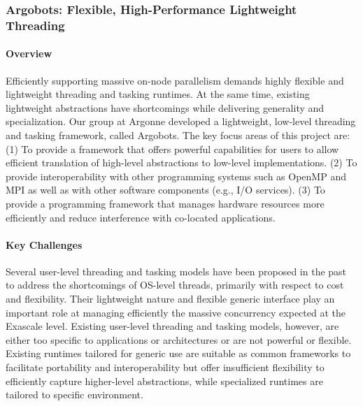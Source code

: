 \subsubsection{ Argobots: Flexible, High-Performance Lightweight Threading }

\paragraph{Overview}

Efficiently supporting massive on-node parallelism demands highly
flexible and lightweight threading and tasking runtimes. At the
same time, existing lightweight abstractions have shortcomings while
delivering generality and specialization.  Our group at Argonne
developed a lightweight, low-level threading and tasking framework,
called Argobots.  The key focus areas of this project are: (1) To
provide a framework that offers powerful capabilities for users to
allow efficient translation of high-level abstractions to low-level
implementations. (2) To provide interoperability with other
programming systems such as OpenMP and MPI as well as with other
software components (e.g., I/O services). (3) To provide a programming
framework that manages hardware resources more efficiently and reduce
interference with co-located applications.

\paragraph{Key Challenges}

Several user-level threading and tasking models have been proposed in
the past to address the shortcomings of OS-level threads, primarily
with respect to cost and flexibility. Their lightweight nature and
flexible generic interface play an important role at managing
efficiently the massive concurrency expected at the Exascale level.
Existing user-level threading and tasking models, however, are either
too specific to applications or architectures or are not powerful or
flexible. Existing runtimes tailored for generic use \cite{GNUPth,
PLDI97_Taura, COSET05_Thibault, COB14_Nakashima, MTAAP08_Wheeler,
PPoPP99_Taura, SenSys06_Dunkels, TBB1, EuroPar08_Perache} are suitable
as common frameworks to facilitate portability and interoperability
but offer insufficient flexibility to efficiently capture higher-level
abstractions, while specialized runtimes \cite{ATC02_Adya,
SolarisThreads, SOSP03_von_Behren, StateThreads, PLDI07_Li,
MTAAP09_Porterfield, WMPP05_Cuvillo, IntelOMP, Nanos++, LCPC96_Kale,
PACT14_Treichler} are tailored to specific environment.

